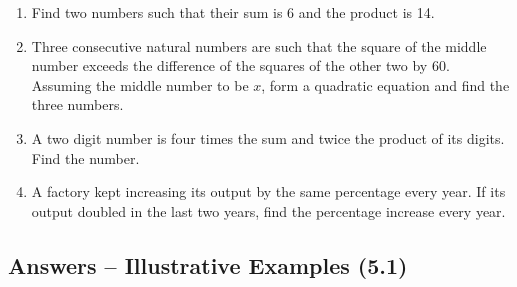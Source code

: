\documentclass[12pt,a4paper]{article}
\begin{document}
\begin{enumerate}[label=Example \arabic*.]
    \item Find two numbers such that their sum is 6 and the product is 14.

    \item Three consecutive natural numbers are such that the square of the middle number exceeds the difference of the squares of the other two by 60. Assuming the middle number to be \( x \), form a quadratic equation and find the three numbers.

    \item A two digit number is four times the sum and twice the product of its digits. Find the number.

    \item A factory kept increasing its output by the same percentage every year. If its output doubled in the last two years, find the percentage increase every year.
\end{enumerate}

\subsection{Answers -- Illustrative Examples (5.1)}
\end{document}
